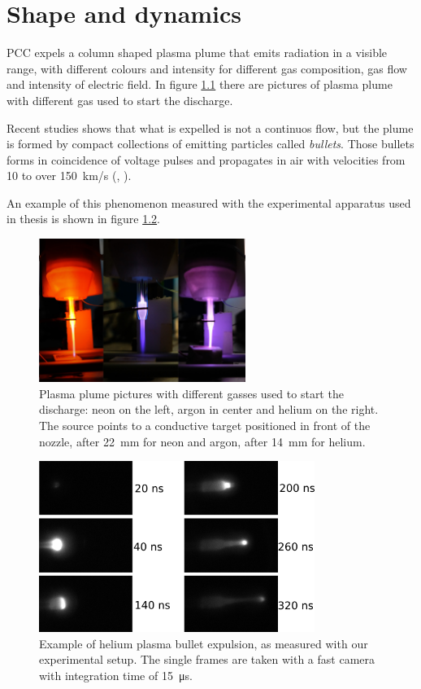 \chapter{Shape and dynamics}
\label{ch:shape}
PCC expels a column shaped plasma plume that emits radiation in a visible range, with different colours and intensity for different gas composition, gas flow and intensity of electric field. In figure \ref{fig:pl_picture} there are pictures of plasma plume with different gas used to start the discharge.

Recent studies shows that what is expelled is not a continuos flow, but the plume is formed by compact collections of emitting particles called \emph{bullets}. Those bullets forms in coincidence of voltage pulses and propagates in air with velocities from \num{10} to over \SI{150}{\kilo\meter/\second} (\cite{Mericam_Bourdet_2009}, \cite{doi:10.1002/ppap.200900078}).

An example of this phenomenon measured with the experimental apparatus used in thesis is shown in figure \ref{fig:pl_bullet}.
\begin{figure}
 \centering
 \includegraphics[width = 0.6\textwidth]{Images/Shape/plasmapic.png}
 \caption{Plasma plume pictures with different gasses used to start the discharge: neon on the left, argon in center and helium on the right. The source points to a conductive target positioned in front of the nozzle, after \SI{22}{\milli\meter} for neon and argon, after \SI{14}{\milli\meter} for helium.}
 \label{fig:pl_picture}
\end{figure}
\begin{figure}
 \centering
 \includegraphics[width=0.8\textwidth]{Images/Shape/frames.png}
 \caption{Example of helium plasma bullet expulsion, as measured with our experimental setup. The single frames are taken with a fast camera with integration time of \SI{15}{\micro\second}.}
 \label{fig:pl_bullet}
\end{figure}

